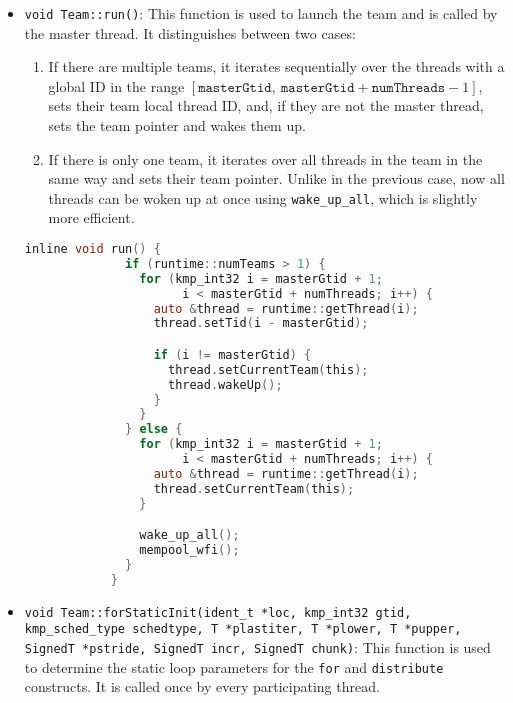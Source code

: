 \begin{itemize}
	\item \texttt{void Team::run()}: This function is used to launch the team and is called by the
	      master thread. It distinguishes between two cases:

	      \begin{enumerate}
              \item If there are multiple teams, it iterates sequentially over the threads with a
                    global ID in the range $[\texttt{masterGtid},\: \texttt{masterGtid} +
                    \texttt{numThreads} - 1]$, sets their team local thread ID, and, if they are not the
		            master thread, sets the team pointer and wakes them up.
		      \item If there is only one team, it iterates over all threads in the team in the same
                    way and sets their team pointer. Unlike in the previous case, now all threads
                    can be woken up at once using \texttt{wake\_up\_all}, which is slightly more efficient.
	      \end{enumerate}


	      \begin{lstlisting}[language=C, caption={void Team::run},
          label={lst:team-run}, escapechar=@]
            inline void run() {
              if (runtime::numTeams > 1) {
                for (kmp_int32 i = masterGtid + 1;
                      i < masterGtid + numThreads; i++) {
                  auto &thread = runtime::getThread(i);
                  thread.setTid(i - masterGtid);

                  if (i != masterGtid) {
                    thread.setCurrentTeam(this);
                    thread.wakeUp();
                  }
                }
              } else {
                for (kmp_int32 i = masterGtid + 1;
                      i < masterGtid + numThreads; i++) {
                  auto &thread = runtime::getThread(i);
                  thread.setCurrentTeam(this);
                }

                wake_up_all();
                mempool_wfi();
              }
            }
          \end{lstlisting}

	\item \texttt{void Team::forStaticInit(ident_t *loc, kmp_int32 gtid,\\kmp_sched_type schedtype,
		      T *plastiter, T *plower, T *pupper,\\SignedT *pstride, SignedT incr, SignedT chunk)}:
	      \label{subsubsec:team-forstaticinit}
	      This function is used to determine the static loop parameters for the \texttt{for} and
	      \texttt{distribute} constructs. It is called once by every participating thread.


\end{itemize}
